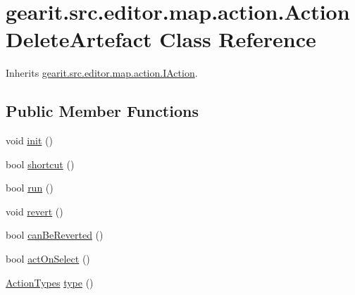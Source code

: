\hypertarget{classgearit_1_1src_1_1editor_1_1map_1_1action_1_1_action_delete_artefact}{\section{gearit.\+src.\+editor.\+map.\+action.\+Action\+Delete\+Artefact Class Reference}
\label{classgearit_1_1src_1_1editor_1_1map_1_1action_1_1_action_delete_artefact}
}


Inherits \hyperlink{interfacegearit_1_1src_1_1editor_1_1map_1_1action_1_1_i_action}{gearit.\+src.\+editor.\+map.\+action.\+I\+Action}.

\subsection*{Public Member Functions}
\begin{DoxyCompactItemize}
\item 
void \hyperlink{classgearit_1_1src_1_1editor_1_1map_1_1action_1_1_action_delete_artefact_a60882967658a367e8b937bf49f7e1a3d}{init} ()
\item 
bool \hyperlink{classgearit_1_1src_1_1editor_1_1map_1_1action_1_1_action_delete_artefact_a53ae529c9a44555d4b55aa3f1ea54c93}{shortcut} ()
\item 
bool \hyperlink{classgearit_1_1src_1_1editor_1_1map_1_1action_1_1_action_delete_artefact_a51726a4077672773cfd9e0a2bf890d5c}{run} ()
\item 
void \hyperlink{classgearit_1_1src_1_1editor_1_1map_1_1action_1_1_action_delete_artefact_a70efba856d5f4c6d2fc933306140e026}{revert} ()
\item 
bool \hyperlink{classgearit_1_1src_1_1editor_1_1map_1_1action_1_1_action_delete_artefact_abafa4adfcf5bf0be0ff890b886e4b36b}{can\+Be\+Reverted} ()
\item 
bool \hyperlink{classgearit_1_1src_1_1editor_1_1map_1_1action_1_1_action_delete_artefact_a650560564a9c6b1e1a3f4cb96b0e4dce}{act\+On\+Select} ()
\item 
\hyperlink{namespacegearit_1_1src_1_1editor_1_1map_1_1action_af036712a7d960b13d1e31954e65c00e3}{Action\+Types} \hyperlink{classgearit_1_1src_1_1editor_1_1map_1_1action_1_1_action_delete_artefact_ae06ace3bdea54f6d5fb4b73961a42d44}{type} ()
\end{DoxyCompactItemize}


